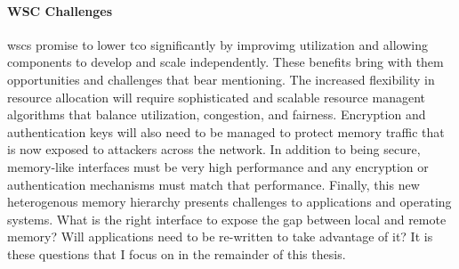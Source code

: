 \paragraph{WSC Challenges} \Glspl{wsc} promise to lower \gls{tco} significantly
by improvimg utilization and allowing components to develop and scale
independently. These benefits bring with them opportunities and challenges that
bear mentioning. The increased flexibility in resource allocation will require
sophisticated and scalable resource managent algorithms that balance
utilization, congestion, and fairness. Encryption and authentication keys will
also need to be managed to protect memory traffic that is now exposed to
attackers across the network. In addition to being secure, memory-like
interfaces must be very high performance and any encryption or authentication
mechanisms must match that performance.  Finally, this new heterogenous memory
hierarchy presents challenges to applications and operating systems. What is
the right interface to expose the gap between local and remote memory? Will
applications need to be re-written to take advantage of it? It is these
questions that I focus on in the remainder of this thesis.

